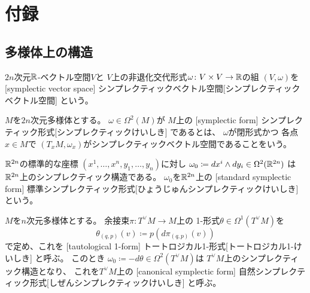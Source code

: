 \documentclass[report]{jlreq}
\begin{document}
%
\newpage
\appendix
\renewcommand\thesection{\Alph{section}}
\setcounter{section}{0}
\section{付録}

\subsection{多様体上の構造}

\begin{definition}[シンプレクティックベクトル空間]
    $2n$次元$\mathbb{R}$-ベクトル空間$V$と
    $V$上の非退化交代形式$\omega \colon V \times V \to \mathbb{R}$の組
    $(V, \omega)$を
    [symplectic vector space]
        {シンプレクティックベクトル空間}[シンプレクティックベクトル空間]
    という。
\end{definition}

\begin{definition}[シンプレクティック形式]
    $M$を$2n$次元多様体とする。
    $\omega \in \Omega^2(M)$が
    $M$上の
    [symplectic form]
        {シンプレクティック形式}[シンプレクティックけいしき]
    であるとは、
    $\omega$が閉形式かつ
    各点$x \in M$で
    $(T_x M, \omega_x)$がシンプレクティックベクトル空間であることをいう。
\end{definition}

\begin{example}[標準シンプレクティック形式]
    $\mathbb{R}^{2n}$の標準的な座標
    $(x^1, \ldots, x^n, y_1, \ldots, y_n)$に対し
    $\omega_0 \coloneqq dx^i \wedge dy_i \in \Omega^2(\mathbb{R}^{2n})$
    は$\mathbb{R}^{2n}$上のシンプレクティック構造である。
    $\omega_0$を$\mathbb{R}^{2n}$上の
    [standard symplectic form]
        {標準シンプレクティック形式}[ひょうじゅんシンプレクティックけいしき]
    という。
\end{example}

\begin{example}[余接束の自然シンプレクティック形式]
    $M$を$n$次元多様体とする。
    余接束$\pi \colon T^\vee M \to M$上の
    1-形式$\theta \in \Omega^1(T^\vee M)$を
    \begin{equation}
        \theta_{(q, p)} (v)
            \coloneqq
                p(d\pi_{(q, p)} (v))
    \end{equation}
    で定め、これを
    [tautological 1-form]
        {トートロジカル1-形式}[トートロジカル1-けいしき]
    と呼ぶ。
    このとき
    $\omega_0 \coloneqq -d\theta \in \Omega^2(T^\vee M)$は
    $T^\vee M$上のシンプレクティック構造となり、
    これを$T^\vee M$上の
    [canonical symplectic form]
        {自然シンプレクティック形式}[しぜんシンプレクティックけいしき]
    と呼ぶ。
\end{example}
\end{document}
